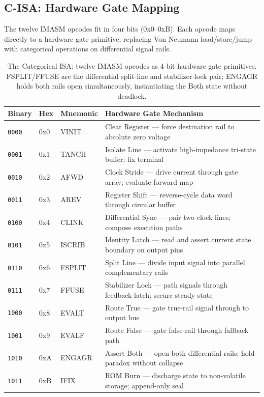 \documentclass[12pt,a4paper]{article}
\begin{document}
\subsection{C-ISA: Hardware Gate Mapping}

The twelve IMASM opcodes fit in four bits (0x0--0xB). Each opcode maps
directly to a hardware gate primitive, replacing Von Neumann load/store/jump
with categorical operations on differential signal rails.

\begin{table}[htbp]
\centering
\small
\begin{tabular}{llll}
\toprule
Binary & Hex & Mnemonic & Hardware Gate Mechanism \\
\midrule
\texttt{0000} & 0x0 & VINIT   & Clear Register --- force destination rail to absolute zero voltage \\
\texttt{0001} & 0x1 & TANCH   & Isolate Line --- activate high-impedance tri-state buffer; fix terminal \\
\texttt{0010} & 0x2 & AFWD    & Clock Stride --- drive current through gate array; evaluate forward map \\
\texttt{0011} & 0x3 & AREV    & Register Shift --- reverse-cycle data word through circular buffer \\
\texttt{0100} & 0x4 & CLINK   & Differential Sync --- pair two clock lines; compose execution paths \\
\texttt{0101} & 0x5 & ISCRIB  & Identity Latch --- read and assert current state boundary on output pins \\
\texttt{0110} & 0x6 & FSPLIT  & Split Line --- divide input signal into parallel complementary rails \\
\texttt{0111} & 0x7 & FFUSE   & Stabilizer Lock --- path signals through feedback-latch; secure steady state \\
\texttt{1000} & 0x8 & EVALT   & Route True --- gate true-rail signal through to output bus \\
\texttt{1001} & 0x9 & EVALF   & Route False --- gate false-rail through fallback path \\
\texttt{1010} & 0xA & ENGAGR  & Assert Both --- open both differential rails; hold paradox without collapse \\
\texttt{1011} & 0xB & IFIX    & ROM Burn --- discharge state to non-volatile storage; append-only seal \\
\bottomrule
\end{tabular}
\caption{The Categorical ISA: twelve IMASM opcodes as 4-bit hardware gate
primitives. FSPLIT/FFUSE are the differential split-line and stabilizer-lock
pair; ENGAGR holds both rails open simultaneously, instantiating the
Both state without deadlock.}
\label{tab:cisa}
\end{table}
\end{document}
